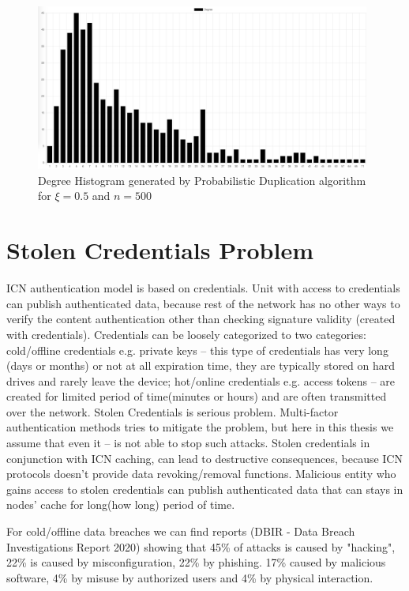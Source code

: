 \documentclass[nostrict]{szablonPG}
\begin{document}
\begin{figure}[h!]
    \includegraphics[width=11cm]{img/propDup500Hist.png}
    \centering
    \caption{Degree Histogram generated by Probabilistic Duplication algorithm for $\xi=0.5$ and $n = 500$}
    \label{fig:propdup500histogram}
\end{figure} 

\section{Stolen Credentials Problem}
ICN authentication model is based on credentials.  Unit with access to credentials can publish authenticated data, because rest of the network has no other ways to verify the content authentication other than checking signature validity (created with credentials). Credentials can be loosely categorized to two categories: cold/offline credentials e.g. private keys -- this type of credentials has very long (days or months) or not at all expiration time, they are typically stored on hard drives and rarely leave the device; hot/online credentials e.g. access tokens -- are created for limited period of time(minutes or hours) and are often transmitted over the network. 
Stolen Credentials is serious problem. Multi-factor authentication methods tries to mitigate the problem, but here in this thesis we assume that even it -- is not able to stop such attacks.
Stolen credentials in conjunction with ICN caching, can lead to destructive consequences, because ICN protocols doesn't provide data revoking/removal functions. Malicious entity who gains access to stolen credentials can publish authenticated data that can stays in nodes' cache for long(how long) period of time. 

For cold/offline data breaches we can find reports (DBIR - Data Breach Investigations Report 2020) showing that 45\% of attacks is caused by "hacking", 22\% is caused by misconfiguration, 22\% by phishing.  17\% caused by malicious software, 4\% by misuse by authorized users and 4\% by physical interaction.
\end{document}
